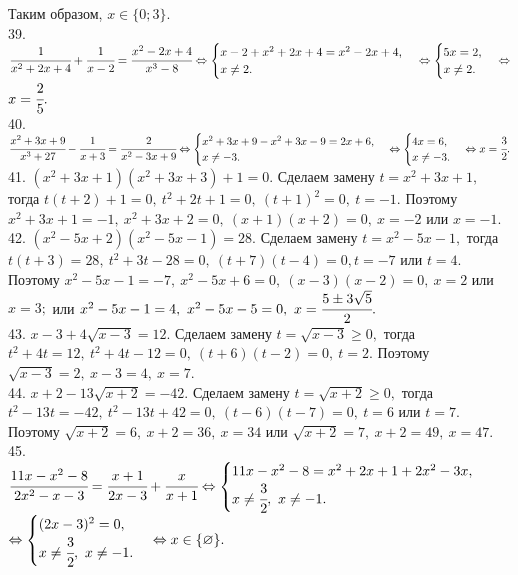\documentclass[12pt]{article}
\begin{document}
Таким образом, $x\in\{0; 3\}.$\\
39. $\cfrac{1}{x^2+2x+4}+\cfrac{1}{x-2}=\cfrac{x^2-2x+4}{x^3-8}\Leftrightarrow \begin{cases}x-2+x^2+2x+4=x^2-2x+4,\\ x\neq2.\end{cases}
\Leftrightarrow \begin{cases}5x=2,\\ x\neq2.\end{cases}\Leftrightarrow$\\$ x=\cfrac{2}{5}.$\\
40. $\cfrac{x^2+3x+9}{x^3+27}-\cfrac{1}{x+3}=\cfrac{2}{x^2-3x+9}\Leftrightarrow \begin{cases}x^2+3x+9-x^2+3x-9=2x+6,\\ x\neq-3.\end{cases}
\Leftrightarrow\begin{cases} 4x=6,\\ x\neq-3.\end{cases}\Leftrightarrow x=\cfrac{3}{2}.$\\
41. $(x^2+3x+1)(x^2+3x+3)+1=0.$ Сделаем замену $t=x^2+3x+1,$ тогда $t(t+2)+1=0,\ t^2+2t+1=0,\ (t+1)^2=0,\ t=-1.$ Поэтому $x^2+3x+1=-1,\
x^2+3x+2=0,\ (x+1)(x+2)=0,\ x=-2$ или $x=-1.$\\
42. $(x^2-5x+2)(x^2-5x-1)=28.$ Сделаем замену $t=x^2-5x-1,$ тогда $t(t+3)=28,\ t^2+3t-28=0,\ (t+7)(t-4)=0, t=-7$ или $t=4.$ Поэтому $x^2-5x-1=-7,\ x^2-5x+6=0,\
(x-3)(x-2)=0,\ x=2$ или $x=3;$ или $x^2-5x-1=4,\ x^2-5x-5=0,\ x=\cfrac{5\pm3\sqrt{5}}{2}.$\\
43. $x-3+4\sqrt{x-3}=12.$ Сделаем замену $t=\sqrt{x-3}\geqslant0,$ тогда $t^2+4t=12,\ t^2+4t-12=0,\ (t+6)(t-2)=0,\ t=2.$ Поэтому $\sqrt{x-3}=2,\ x-3=4,\ x=7.$\\
44. $x+2-13\sqrt{x+2}=-42.$ Сделаем замену $t=\sqrt{x+2}\geqslant0,$ тогда $t^2-13t=-42,\ t^2-13t+42=0,\ (t-6)(t-7)=0,\ t=6$ или $t=7.$ Поэтому $\sqrt{x+2}=6,\ x+2=36,\ x=34$ или $\sqrt{x+2}=7,\ x+2=49,\ x=47.$\\
45. $\cfrac{11x-x^2-8}{2x^2-x-3}=\cfrac{x+1}{2x-3}+\cfrac{x}{x+1}\Leftrightarrow \begin{cases} 11x-x^2-8=x^2+2x+1+2x^2-3x,\\ x\neq\cfrac{3}{2},\ x\neq-1.\end{cases}$\\$
\Leftrightarrow \begin{cases} (2x-3)^2=0,\\ x\neq\cfrac{3}{2},\ x\neq-1.\end{cases}\Leftrightarrow x\in\{\varnothing\}.$\\
\end{document}
